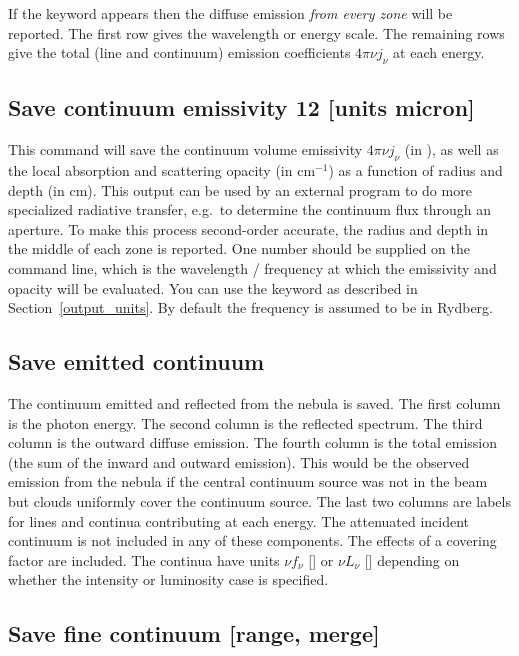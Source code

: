 If the keyword  appears then the diffuse emission
\emph{from every zone} will be reported.
The first row gives the wavelength or energy scale.
The remaining rows give the total (line and continuum)
emission coefficients $4 \pi \nu j_{\nu}$
at each energy.

\subsection{Save continuum emissivity 12 [units micron]}

This command will save the continuum volume emissivity $4\pi \nu j_\nu$ (in
\ergpccmps), as well as the local absorption and scattering opacity (in
cm$^{-1}$) as a function of radius and depth (in cm). This output can be used by an
external program to do more specialized radiative transfer, e.g.\ to determine
the continuum flux through an aperture. To make this process second-order
accurate, the radius and depth in the middle of each zone is reported. One number should
be supplied on the command line, which is the wavelength / frequency at which
the emissivity and opacity will be evaluated. You can use the keyword
 as described in Section~\ref{output_units}. By default the
frequency is assumed to be in Rydberg.

\subsection{Save emitted continuum}

The continuum emitted and reflected from the nebula is saved.
The
first column is the photon energy.
The second column is the reflected
spectrum.
The third column is the outward diffuse emission.
The fourth
column is the total emission (the sum of the inward and outward emission).
This would be the observed emission from the nebula if the central continuum
source was not in the beam but clouds uniformly cover the continuum source.
The last two columns are labels for lines and continua contributing at each
energy.
The attenuated incident continuum is not included in any of these
components.
The effects of a covering factor are included.
The continua have units
$\nu f_{\nu}$ [\ergpscmps ] or $\nu L_{\nu}$ [\ergps ] 
depending on whether the intensity or luminosity case is specified.

\subsection{Save fine continuum [range, merge]}

